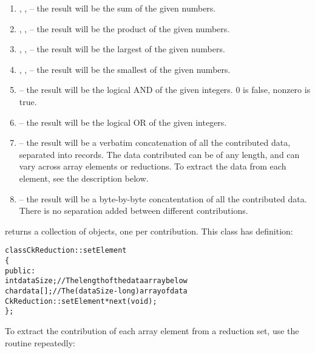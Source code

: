 \begin{enumerate}

\item {}, , -- the
result will be the sum of the given numbers.

\item {}, ,
-- the result will be the product of the given numbers.

\item {}, , -- the
result will be the largest of the given numbers.

\item {}, , -- the
result will be the smallest of the given numbers.

\item {}-- the result will be the logical AND of the given
integers.  0 is false, nonzero is true.

\item {}-- the result will be the logical OR of the given
integers.

\item {}-- the result will be a verbatim concatenation of
all the contributed data, separated into  records.
The data contributed can be of any length, and can vary across array elements
or reductions.  To extract the data from each element, see the description
below.

\item {}-- the result will be a byte-by-byte
concatentation of all the contributed data.  There is no separation
added between different contributions.

\end{enumerate}


 returns a collection of 
objects, one per contribution.  This class has definition:

\begin{alltt}
class CkReduction::setElement 
\{
public:
  int dataSize;//The length of the data array below
  char data[];//The (dataSize-long) array of data
  CkReduction::setElement *next(void);
\};
\end{alltt}

To extract the contribution of each array element from a reduction set, use the
 routine repeatedly:

